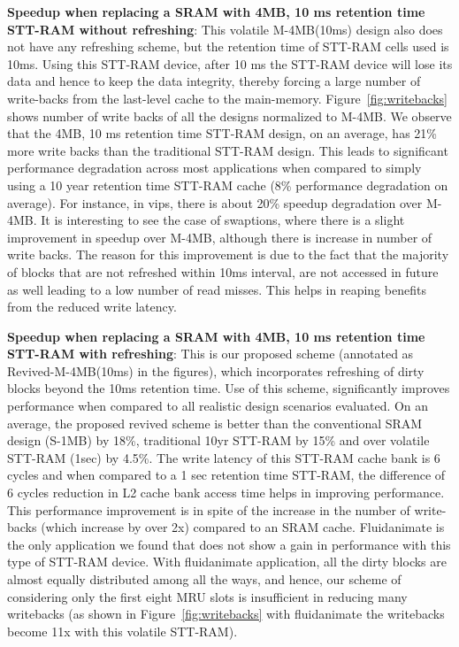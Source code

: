 {\bf Speedup when replacing a SRAM with 4MB, 10 ms retention time STT-RAM without refreshing}: This volatile M-4MB(10ms) design also does not have any refreshing scheme, but the retention time of STT-RAM cells used is 10ms. Using this STT-RAM device, after 10 ms the STT-RAM device will lose its data and hence to keep the data integrity, thereby forcing a large number of write-backs from the last-level cache to the main-memory. Figure~\ref{fig:writebacks} shows number of write backs of all the designs normalized to M-4MB. We observe that the 4MB, 10 ms retention time STT-RAM design, on an average, has 21\% more write backs than the traditional STT-RAM design.
This leads to significant performance degradation across most applications when compared to simply using a 10 year retention time STT-RAM cache (8\% performance degradation on average). For instance, in vips, there is about 20\% speedup
degradation over M-4MB. It is interesting to see the case of swaptions, where there is a slight improvement in speedup over M-4MB, although
there is increase in number of write backs. The reason for this improvement is due to the fact that the majority of blocks that are not refreshed within 10ms interval, are not accessed in future as well leading to a low number of read misses. This helps in reaping benefits from the reduced write latency.

{\bf Speedup when replacing a SRAM with 4MB, 10 ms retention time STT-RAM with refreshing}: This is our proposed scheme (annotated as Revived-M-4MB(10ms) in the figures), which incorporates refreshing of dirty blocks beyond the 10ms retention time.
Use of this scheme, significantly improves performance when compared to all realistic design scenarios evaluated. On an average, the proposed revived scheme is better than the conventional SRAM design (S-1MB) by 18\%, traditional 10yr STT-RAM by 15\% and over volatile STT-RAM (1sec)
by 4.5\%. The write latency of this STT-RAM cache bank is 6 cycles and when compared to a 1 sec retention time STT-RAM, the difference of 6 cycles reduction in L2 cache bank access time helps in improving performance. This performance improvement is in spite of the increase in the number of write-backs (which increase by over 2x) compared to an SRAM cache. Fluidanimate is the only application we found that does not show a gain in performance with this type of STT-RAM device. With fluidanimate application, all the dirty blocks are almost equally distributed among all the ways, and hence, our scheme of considering only the first eight MRU slots is insufficient in reducing many writebacks (as shown in Figure~\ref{fig:writebacks} with fluidanimate the writebacks become 11x with this volatile STT-RAM).

